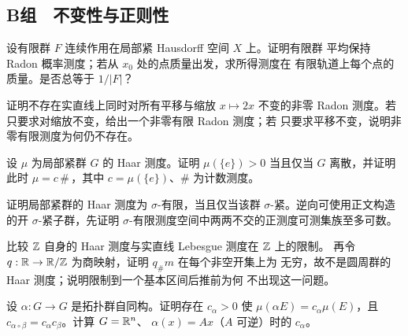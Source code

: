 \subsection*{B组　不变性与正则性}
\begin{enumerate}[label=\textbf{\thechapter.\arabic*.},resume]
设有限群 $F$ 连续作用在局部紧 Hausdorff 空间 $X$ 上。证明有限群
平均保持 Radon 概率测度；若从 $x_0$ 处的点质量出发，求所得测度在
有限轨道上每个点的质量。是否总等于 $1/|F|$？

证明不存在实直线上同时对所有平移与缩放 $x\mapsto2x$ 不变的非零
Radon 测度。若只要求对缩放不变，给出一个非零有限 Radon 测度；若
只要求平移不变，说明非零有限测度为何仍不存在。

设 $\mu$ 为局部紧群 $G$ 的 Haar 测度。证明
$\mu(\{e\})>0$ 当且仅当 $G$ 离散，并证明此时
$\mu=c\,\#\,$，其中 $c=\mu(\{e\})$、$\#$ 为计数测度。

证明局部紧群的 Haar 测度为 $\sigma$-有限，当且仅当该群
$\sigma$-紧。逆向可使用正文构造的开 $\sigma$-紧子群，先证明
$\sigma$-有限测度空间中两两不交的正测度可测集族至多可数。

比较 $\mathbb{Z}$ 自身的 Haar 测度与实直线 Lebesgue 测度在 $\mathbb{Z}$ 上的限制。
再令 $q:\mathbb{R}\to\mathbb{R}/\mathbb{Z}$ 为商映射，证明 $q_\#m$ 在每个非空开集上为
无穷，故不是圆周群的 Haar 测度；说明限制到一个基本区间后推前为何
不出现这一问题。

设 $\alpha:G\to G$ 是拓扑群自同构。证明存在 $c_\alpha>0$ 使
$\mu(\alpha E)=c_\alpha\mu(E)$，且
$c_{\alpha\circ\beta}=c_\alpha c_\beta$。计算 $G=\mathbb{R}^n$、
$\alpha(x)=Ax$（$A$ 可逆）时的 $c_\alpha$。
\end{enumerate}

